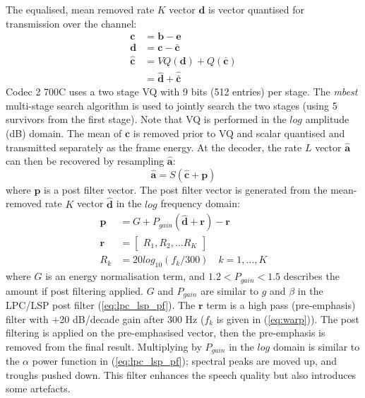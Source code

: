 \documentclass{article}
\begin{document}
{The equalised, mean removed rate $K$ vector $\mathbf{d}$ is vector quantised for transmission over the channel:
\begin{equation}
\begin{split}
\mathbf{c} &= \mathbf{b} - \mathbf{e} \\
\mathbf{d} &= \mathbf{c} - \bar{\mathbf{c}} \\
\hat{\mathbf{c}} &= VQ(\mathbf{d}) + Q(\bar{\mathbf{c}}) \\
                 &= \hat{\mathbf{d}} + \hat{\bar{\mathbf{c}}}
\end{split}
\end{equation}
Codec 2 700C uses a two stage VQ with 9 bits (512 entries) per stage. The \emph{mbest} multi-stage search algorithm is used to jointly search the two stages (using 5 survivors from the first stage).  Note that VQ is performed in the $log$ amplitude (dB) domain. The mean of $\mathbf{c}$ is removed prior to VQ and scalar quantised and transmitted separately as the frame energy. At the decoder, the rate $L$ vector $\hat{\mathbf{a}}$ can then be recovered by resampling $\mathbf{\hat{a}}$:
\begin{equation}
\hat{\mathbf{a}} = S(\hat{\mathbf{c}} + \mathbf{p})
\end{equation}
where $\mathbf{p}$ is a post filter vector. The post filter vector is generated from the mean-removed rate $K$ vector $\hat{\mathbf{d}}$ in the $log$ frequency domain:
\begin{equation}
\begin{split}
\mathbf{p} &= G + P_{gain} \left( \hat{\mathbf{d}} + \mathbf{r} \right) - \mathbf{r} \\
\mathbf{r} &= \begin{bmatrix} R_1, R_2, \ldots R_K \end{bmatrix} \\
       R_k &= 20log_{10}(f_k/300) \quad k=1,...,K 
\end{split}
\end{equation}
where $G$ is an energy normalisation term, and $1.2 < P_{gain} < 1.5$ describes the amount if post filtering applied.  $G$ and $P_{gain}$ are similar to $g$ and $\beta$ in the LPC/LSP post filter (\ref{eq:lpc_lsp_pf}).  The $\mathbf{r}$ term is a high pass (pre-emphasis) filter with +20 dB/decade gain after 300 Hz ($f_k$ is given in (\ref{eq:warp})).  The post filtering is applied on the pre-emphasised vector, then the pre-emphasis is removed from the final result.  Multiplying by $P_{gain}$ in the $log$ domain is similar to the $\alpha$ power function in (\ref{eq:lpc_lsp_pf}); spectral peaks are moved up, and troughs pushed down.  This filter enhances the speech quality but also introduces some artefacts.

}
\end{document}
